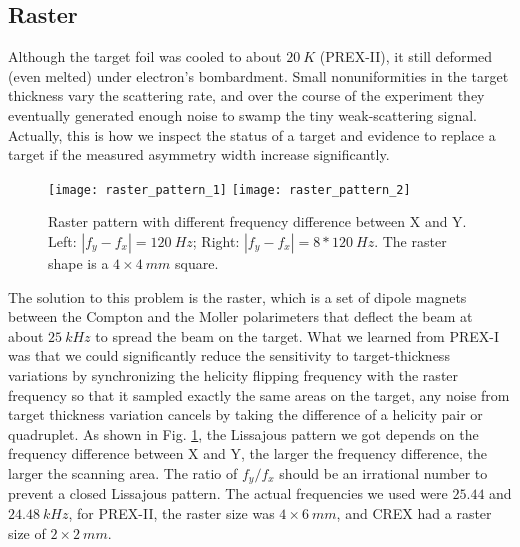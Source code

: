 \subsection{Raster}
Although the target foil was cooled to about $20\ K$ (PREX-II), it still deformed (even melted)
under electron's bombardment. Small nonuniformities in the target 
thickness vary the scattering rate, and over the course of the experiment they 
eventually generated enough noise to swamp the tiny weak-scattering signal.
Actually, this is how we inspect the status of a target and evidence to
replace a target if the measured asymmetry width increase significantly.

\begin{figure}
    \centering
    \texttt{[image: raster\_pattern\_1]}
    \texttt{[image: raster\_pattern\_2]}
    \caption{Raster pattern with different frequency difference between X and Y.
    Left: $|f_y - f_x| = 120\ Hz$; Right: $|f_y - f_x| = 8*120\ Hz$. The raster
    shape is a $4\times 4\ mm$ square.} 
    \label{fig:raster_pattern}
\end{figure}

The solution to this problem is the raster, which is a set of dipole magnets %
between the Compton and the Moller polarimeters
that deflect the beam at about $25\ kHz$ to spread the beam on the target.
What we learned from PREX-I was that we could significantly reduce the sensitivity 
to target-thickness variations by synchronizing the helicity flipping frequency
with the raster frequency so that it sampled exactly the same areas on the target,
any noise from target thickness variation cancels by taking the difference of
a helicity pair or quadruplet. 
As shown in Fig. \ref{fig:raster_pattern}, the Lissajous pattern we got depends
on the frequency difference between X and Y, the larger the frequency difference,
the larger the scanning area. The ratio of $f_y/f_x$ should be an irrational number
to prevent a closed Lissajous pattern. The actual frequencies we used were $25.44$
and $24.48\ kHz$, for PREX-II, the raster size was $4 \times 6\ mm$, and CREX
had a raster size of $2 \times 2\ mm$.


